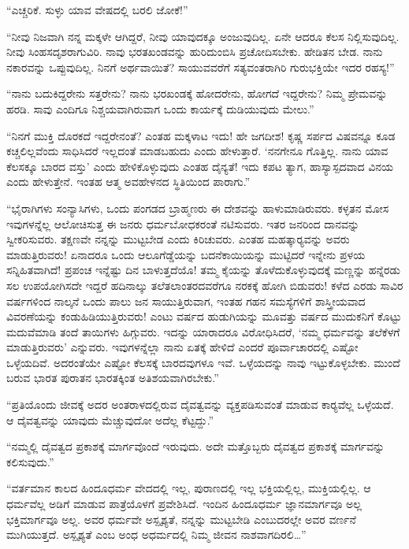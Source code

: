  “ಎಚ್ಚರಿಕೆ. ಸುಳ್ಳು ಯಾವ ವೇಷದಲ್ಲಿ ಬರಲಿ ಜೋಕೆ!” 

 “ನೀವು ನಿಜವಾಗಿ ನನ್ನ ಮಕ್ಕಳೇ ಆಗಿದ್ದರೆ, ನೀವು ಯಾವುದಕ್ಕೂ ಅಂಜುವುದಿಲ್ಲ. ಏನೇ ಆದರೂ ಕೆಲಸ ನಿಲ್ಲಿಸುವುದಿಲ್ಲ. ನೀವು ಸಿಂಹಸದೃಶರಾಗುವಿರಿ. ನಾವು ಭರತಖಂಡವನ್ನು ಹುರಿದುಂಬಿಸಿ ಪ್ರಚೋದಿಸಬೇಕು. ಹೇಡಿತನ ಬೇಡ. ನಾನು ನಕಾರವನ್ನು ಒಪ್ಪುವುದಿಲ್ಲ. ನಿನಗೆ ಅರ್ಥವಾಯಿತೆ? ಸಾಯುವವರೆಗೆ ಸತ್ಯವಂತರಾಗಿರಿ ಗುರುಭಕ್ತಿಯೇ ಇದರ ರಹಸ್ಯ!” 

 “ನಾನು ಬದುಕಿದ್ದರೇನು ಸತ್ತರೇನು? ನಾನು ಭರಖಂಡಕ್ಕೆ ಹೋದರೇನು, ಹೋಗದೆ ಇದ್ದರೇನು? ನಿಮ್ಮ ಪ್ರೇಮವನ್ನು ಹರಡಿ. ಸಾವು ಎಂದಿಗೂ ನಿಶ್ಚಯವಾಗಿರುವಾಗ ಒಂದು ಕಾರ್ಯಕ್ಕೆ ದುಡಿಯುವುದು ಮೇಲು.” 

 “ನಿನಗೆ ಮುಕ್ತಿ ದೊರಕದೆ ಇದ್ದರೇನಂತೆ? ಎಂತಹ ಮಕ್ಕಳಾಟ ಇದು! ಹೇ ಜಗದೀಶ! ಕೃಷ್ಣ ಸರ್ಪದ ವಿಷವನ್ನೂ ಕೂಡ ಕಚ್ಚಲಿಲ್ಲವೆಂದು ಸಾಧಿಸಿದರೆ ಇಲ್ಲದಂತೆ ಮಾಡಬಹುದು ಎಂದು ಹೇಳುತ್ತಾರೆ. ‘ನನಗೇನೂ ಗೊತ್ತಿಲ್ಲ. ನಾನು ಯಾವ ಕೆಲಸಕ್ಕೂ ಬಾರದ ವಸ್ತು’ ಎಂದು ಹೇಳಿಕೊಳ್ಳುವುದು ಎಂತಹ ದೈನ್ಯತೆ! ಇದು ಕಪಟ ತ್ಯಾಗ, ಹಾಸ್ಯಾಸ್ಪದವಾದ ವಿನಯ ಎಂದು ಹೇಳುತ್ತೇನೆ. ಇಂತಹ ಆತ್ಮ ಅವಹೇಳನದ ಸ್ಥಿತಿಯಿಂದ ಪಾರಾಗು.” 

 “ಭೈರಾಗಿಗಳು ಸಂನ್ಯಾಸಿಗಳು, ಒಂದು ಪಂಗಡದ ಬ್ರಾಹ್ಮಣರು ಈ ದೇಶವನ್ನು ಹಾಳುಮಾಡಿರುವರು. ಕಳ್ಳತನ ಮೋಸ ಇವುಗಳನ್ನೆಲ್ಲ ಆಲೋಚಿಸುತ್ತ ಈ ಜನರು ಧರ್ಮಬೋಧಕರಂತೆ ನಟಿಸುವರು. ಇತರ ಜನರಿಂದ ದಾನವನ್ನು ಸ್ವೀಕರಿಸುವರು. ತಕ್ಷಣವೇ ನನ್ನನ್ನು ಮುಟ್ಟಬೇಡ ಎಂದು ಕಿರಿಚುವರು. ಎಂತಹ ಮಹತ್ಕಾರ‍್ಯವನ್ನು ಅವರು ಮಾಡುತ್ತಿರುವರು! ಏನಾದರೂ ಒಂದು ಆಲೂಗೆಡ್ಡೆಯನ್ನು ಬದನೆಕಾಯಿಯನ್ನು ಮುಟ್ಟಿದರೆ ಇನ್ನೇನು ಪ್ರಳಯ ಸನ್ನಿಹಿತವಾಗಿದೆ! ಪ್ರಪಂಚ ಇನ್ನೆಷ್ಟು ದಿನ ಬಾಳುತ್ತದೆಯೊ! ತಮ್ಮ ಕೈಯನ್ನು ತೊಳೆದುಕೊಳ್ಳುವುದಕ್ಕೆ ಮಣ್ಣನ್ನು ಹನ್ನೆರಡು ಸಲ ಉಪಯೋಗಿಸದೇ ಇದ್ದರೆ ಹದಿನಾಲ್ಕು ತಲೆತಲಾಂತರದವರೆಗೂ ನರಕಕ್ಕೆ ಹೋಗಿ ಬಿಡುವರು! ಕಳೆದ ಎರಡು ಸಾವಿರ ವರ್ಷಗಳಿಂದ ನಾಲ್ಕನೆ ಒಂದು ಪಾಲು ಜನ ಸಾಯುತ್ತಿರುವಾಗ, ಇಂತಹ ಗಹನ ಸಮಸ್ಯೆಗಳಿಗೆ ಶಾಸ್ತ್ರೀಯವಾದ ವಿವರಣೆಯನ್ನು ಕಂಡುಹಿಡಿಯುತ್ತಿರುವರು! ಎಂಟು ವರ್ಷದ ಹುಡುಗಿಯನ್ನು ಮೂವತ್ತು ವರ್ಷದ ಮುದುಕನಿಗೆ ಕೊಟ್ಟು ಮದುವೆಮಾಡಿ ತಂದೆ ತಾಯಿಗಳು ಹಿಗ್ಗುವರು. ಇದನ್ನು ಯಾರಾದರೂ ವಿರೋಧಿಸಿದರೆ, ‘ನಮ್ಮ ಧರ್ಮವನ್ನು ತಲೆಕೆಳಗೆ ಮಾಡುತ್ತಿರುವರು’ ಎನ್ನುವರು. ಇವುಗಳನ್ನೆಲ್ಲಾ ನಾನು ಏತಕ್ಕೆ ಹೇಳಿದೆ ಎಂದರೆ ಪೂರ್ವಾಚಾರದಲ್ಲಿ ಎಷ್ಟೋ ಒಳ್ಳೆಯದಿವೆ. ಅದರಂತೆಯೇ ಎಷ್ಟೋ ಕೆಲಸಕ್ಕೆ ಬಾರದವುಗಳೂ ಇವೆ. ಒಳ್ಳೆಯದನ್ನು ನಾವು ಇಟ್ಟುಕೊಳ್ಳಬೇಕು. ಮುಂದೆ ಬರುವ ಭಾರತ ಪುರಾತನ ಭಾರತಕ್ಕಿಂತ ಅತಿಶಯವಾಗಿರಬೇಕು.” 

 “ಪ್ರತಿಯೊಂದು ಜೀವಕ್ಕೆ ಅದರ ಅಂತರಾಳದಲ್ಲಿರುವ ದೈವತ್ವವನ್ನು ವ್ಯಕ್ತಪಡಿಸುವಂತೆ ಮಾಡುವ ಕಾರ‍್ಯವೆಲ್ಲ ಒಳ್ಳೆಯದೆ. ಆ ದೈವತ್ವವನ್ನು ಯಾವುದು ಮೆಚ್ಚುವುದೋ ಅದೆಲ್ಲ ಕೆಟ್ಟದ್ದು.” 

 “ನಮ್ಮಲ್ಲಿ ದೈವತ್ವದ ಪ್ರಕಾಶಕ್ಕೆ ಮಾರ್ಗವೊಂದೆ ಇರುವುದು. ಅದೇ ಮತ್ತೊಬ್ಬರು ದೈವತ್ವದ ಪ್ರಕಾಶಕ್ಕೆ ಮಾರ್ಗವನ್ನು ಕಲಿಸುವುದು.” 

 “ವರ್ತಮಾನ ಕಾಲದ ಹಿಂದೂಧರ್ಮ ವೇದದಲ್ಲಿ ಇಲ್ಲ, ಪುರಾಣದಲ್ಲಿ ಇಲ್ಲ ಭಕ್ತಿಯಲ್ಲಿಲ್ಲ, ಮುಕ್ತಿಯಲ್ಲಿಲ್ಲ. ಆ ಧರ್ಮವೆಲ್ಲ ಅಡಿಗೆ ಮಾಡುವ ಪಾತ್ರೆಯೊಳಗೆ ಪ್ರವೇಶಿಸಿದೆ. ಇಂದಿನ ಹಿಂದೂಧರ್ಮ ಜ್ಞಾನಮಾರ್ಗವೂ ಅಲ್ಲ ಭಕ್ತಿಮಾರ್ಗವೂ ಅಲ್ಲ. ಅವರ ಧರ್ಮವೇ ಅಸ್ಪೃಶ್ಯತೆ, ನನ್ನನ್ನು ಮುಟ್ಟಬೇಡಿ ಎಂಬುದರಲ್ಲೇ ಅವರ ವರ್ಣನೆ ಮುಗಿಯುತ್ತದೆ. ಅಸ್ಪೃಶ್ಯತೆ ಎಂಬ ಅಂಧ ಅಧರ್ಮದಲ್ಲಿ ನಿಮ್ಮ ಜೀವನ ನಾಶವಾಗದಿರಲಿ…” 


